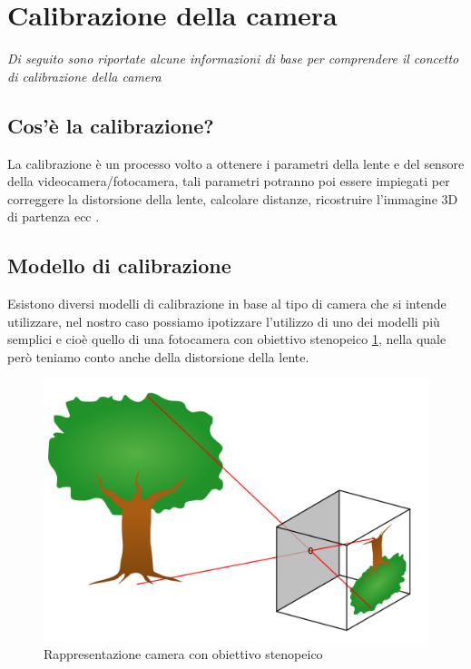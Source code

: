 \documentclass[12pt,a4paper,openright,twoside]{book}
\begin{document}
\section{Calibrazione della camera} \label{sec:calibrazione_della_camera}
\textit{Di seguito sono riportate alcune informazioni di base per comprendere il concetto di calibrazione della camera}	
\subsection{Cos'è la calibrazione?}
La calibrazione è un processo volto a ottenere i parametri della lente e del sensore della videocamera/fotocamera,
tali parametri potranno poi essere impiegati per correggere la distorsione della lente, calcolare distanze, ricostruire l'immagine 3D di partenza ecc \cite{cameraCalibrationMathWorks}.
\subsection{Modello di calibrazione}
Esistono diversi modelli di calibrazione in base al tipo di camera che si intende utilizzare, nel nostro caso possiamo ipotizzare l'utilizzo di uno dei modelli più semplici e cioè quello di una fotocamera con obiettivo stenopeico \ref{fig:pinhole_camera}, nella quale però teniamo conto anche della distorsione della lente. \cite{pinholeCamera} \cite{pinholeCameraModel} 
\begin{figure}
	\centering
	\includegraphics[width=0.5\linewidth]{./figures/Pinhole-camera.png}
	\caption{Rappresentazione camera con obiettivo stenopeico}
	\label{fig:pinhole_camera}
\end{figure}
\end{document}
